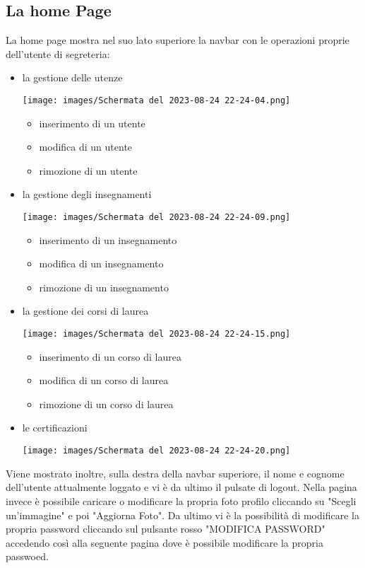 \documentclass{article}
\begin{document}
    \subsection{La home Page}
    La home page mostra nel suo lato superiore la navbar con le operazioni proprie dell'utente di segreteria:
    \begin{itemize}
        \item la gestione delle utenze

        \texttt{[image: images/Schermata del 2023-08-24 22-24-04.png]}

        \begin{itemize}
            \item inserimento di un utente
            \item modifica di un utente
            \item rimozione di un utente
        \end{itemize}

        \pagebreak
        \item la gestione degli insegnamenti

        \texttt{[image: images/Schermata del 2023-08-24 22-24-09.png]}

        \begin{itemize}
            \item inserimento di un insegnamento
            \item modifica di un insegnamento
            \item rimozione di un insegnamento
        \end{itemize}
        \item la gestione dei corsi di laurea

        \texttt{[image: images/Schermata del 2023-08-24 22-24-15.png]}

        \begin{itemize}
            \item inserimento di un corso di laurea
            \item modifica di un corso di laurea
            \item rimozione di un corso di laurea
        \end{itemize}

        \pagebreak

        \item le certificazioni

        \texttt{[image: images/Schermata del 2023-08-24 22-24-20.png]}

    \end{itemize}
    Viene mostrato inoltre, sulla destra della navbar superiore, il nome e cognome dell'utente attualmente loggato e vi è da ultimo il pulsate di logout.
    Nella pagina invece è possibile caricare o modificare la propria foto profilo cliccando su "Scegli un'immagine" e poi "Aggiorna Foto".
    Da ultimo vi è la possibilità di modificare la propria password cliccando sul pulsante rosso "MODIFICA PASSWORD" accedendo così alla seguente pagina dove è possibile modificare la propria passwoed.
\end{document}
